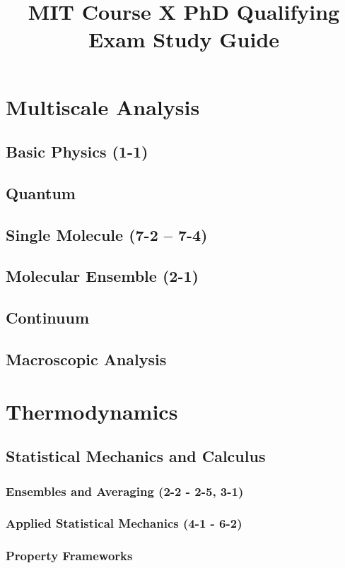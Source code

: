 \documentclass{mitqualif}
\title{MIT Course X PhD Qualifying Exam Study Guide}
\begin{document}
\mytitlepage %
\newpage

\tableofcontents
\newpage

\chapter{Multiscale Analysis}
\section{Basic Physics (1-1)}

\section{Quantum}
\section{Single Molecule (7-2 -- 7-4)}



\section{Molecular Ensemble (2-1)}

\section{Continuum}
\section{Macroscopic Analysis}
\clearpage
\chapter{Thermodynamics}
\section{Statistical Mechanics and Calculus}
\subsection{Ensembles and Averaging (2-2 - 2-5, 3-1)}




\subsection{Applied Statistical Mechanics (4-1 - 6-2)}


\subsection{Property Frameworks}
\end{document}
